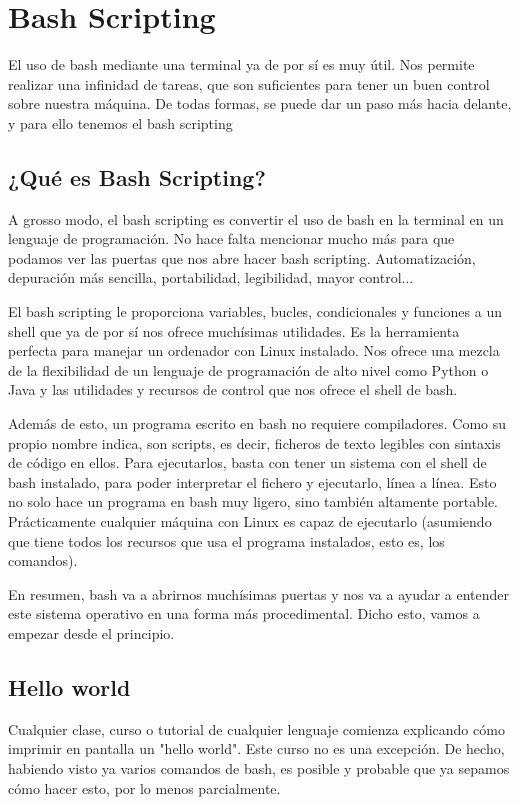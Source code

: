 \chapter{Bash Scripting}
El uso de bash mediante una terminal ya de por sí es muy útil. Nos permite realizar una infinidad de tareas, que son suficientes para tener un buen control sobre nuestra máquina. De todas formas, se puede dar un paso más hacia delante, y para ello tenemos el bash scripting

\section{¿Qué es Bash Scripting?}
A grosso modo, el bash scripting es convertir el uso de bash en la terminal en un lenguaje de programación. No hace falta mencionar mucho más para que podamos ver las puertas que nos abre hacer bash scripting. Automatización, depuración más sencilla, portabilidad, legibilidad, mayor control...

El bash scripting le proporciona variables, bucles, condicionales y funciones a un shell que ya de por sí nos ofrece muchísimas utilidades. Es la herramienta perfecta para manejar un ordenador con Linux instalado. Nos ofrece una mezcla de la flexibilidad de un lenguaje de programación de alto nivel como Python o Java y las utilidades y recursos de control que nos ofrece el shell de bash. 

Además de esto, un programa escrito en bash no requiere compiladores. Como su propio nombre indica, son scripts, es decir, ficheros de texto legibles con sintaxis de código en ellos. Para ejecutarlos, basta con tener un sistema con el shell de bash instalado, para poder interpretar el fichero y ejecutarlo, línea a línea. Esto no solo hace un programa en bash muy ligero, sino también altamente portable. Prácticamente cualquier máquina con Linux es capaz de ejecutarlo (asumiendo que tiene todos los recursos que usa el programa instalados, esto es, los comandos).

En resumen, bash va a abrirnos muchísimas puertas y nos va a ayudar a entender este sistema operativo en una forma más procedimental. Dicho esto, vamos a empezar desde el principio.

\section{Hello world}
Cualquier clase, curso o tutorial de cualquier lenguaje comienza explicando cómo imprimir en pantalla un "hello world". Este curso no es una excepción. De hecho, habiendo visto ya varios comandos de bash, es posible y probable que ya sepamos cómo hacer esto, por lo menos parcialmente.

